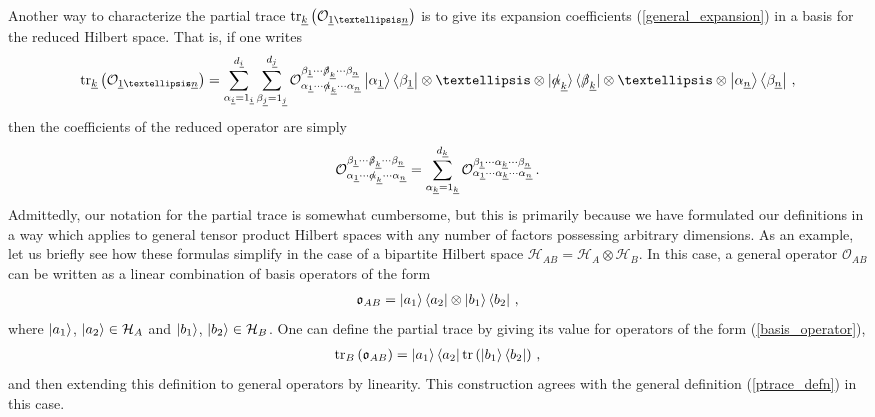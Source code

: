 \documentclass[12pt]{article}
\newcommand{\ul}[1]{{\underline{#1}}}
\numberwithin{equation}{section}
\begin{document}
Another way to characterize the partial trace $\tr_{\ul{k}} \left( \mathcal{O}_{\ul{1} \ldots \ul{n}} \right)$ is to give its expansion coefficients (\ref{general_expansion}) in a basis for the reduced Hilbert space. That is, if one writes
%
\begin{align}
    \tr_{\ul{k}} \left( \mathcal{O}_{\ul{1} \ldots \ul{n}} \right) = \sum_{\alpha_{\ul{i}} = 1_{\ul{i}}}^{d_{\ul{i}}} \sum_{\beta_{\ul{j}} = 1_{\ul{j}}}^{d_{\ul{j}}} \mathcal{O}_{\alpha_\ul{1} \cdots \slashed{\alpha}_{\ul{k}} \cdots \alpha_\ul{n}}^{\beta_\ul{1} \cdots \slashed{\beta}_{\ul{k}} \cdots \beta_\ul{n}} \ket{\alpha_{\ul{1}}} \bra{\beta_{\ul{1}}} \otimes \ldots \otimes | \slashed{\alpha}_{\ul{k}} \rangle \, \langle \slashed{\beta}_{\ul{k}} | \otimes \ldots \otimes \ket{\alpha_{\ul{n}}} \bra{\beta_{\ul{n}}} \, ,
\end{align}
%
then the coefficients of the reduced operator are simply
%
\begin{align}
    \mathcal{O}_{\alpha_\ul{1} \cdots \slashed{\alpha}_{\ul{k}} \cdots \alpha_\ul{n}}^{\beta_\ul{1} \cdots \slashed{\beta}_{\ul{k}} \cdots \beta_\ul{n}} = \sum_{\alpha_{\ul{k}} = 1_{\ul{k}}}^{d_{\ul{k}}} \mathcal{O}_{\alpha_\ul{1} \cdots \alpha_{\ul{k}} \cdots \alpha_\ul{n}}^{\beta_\ul{1} \cdots \alpha_{\ul{k}} \cdots \beta_\ul{n}} \, .
\end{align}
%
Admittedly, our notation for the partial trace is somewhat cumbersome, but this is primarily because we have formulated our definitions in a way which applies to general tensor product Hilbert spaces with any number of factors possessing arbitrary dimensions. As an example, let us briefly see how these formulas simplify in the case of a bipartite Hilbert space $\mathcal{H}_{AB} = \mathcal{H}_A \otimes \mathcal{H}_B$. In this case, a general operator $\mathcal{O}_{AB}$ can be written as a linear combination of basis operators of the form
%
\begin{align}\label{basis_operator}
    \mathfrak{o}_{AB} = \ket{a_1} \bra{a_2} \otimes \ket{b_1} \bra{b_2} \, ,
\end{align}
%
where $\ket{a_1}$, $\ket{a_2} \in \mathcal{H}_A$ and $\ket{b_1}$, $\ket{b_2} \in \mathcal{H}_B$. One can define the partial trace by giving its value for operators of the form (\ref{basis_operator}),
%
\begin{align}
    \tr_B \left( \mathfrak{o}_{AB}  \right) = \ket{a_1} \bra{a_2} \tr \left( \ket{b_1} \bra{b_2} \right) \, ,
\end{align}
%
and then extending this definition to general operators by linearity. This construction agrees with the general definition (\ref{ptrace_defn}) in this case.
\end{document}
